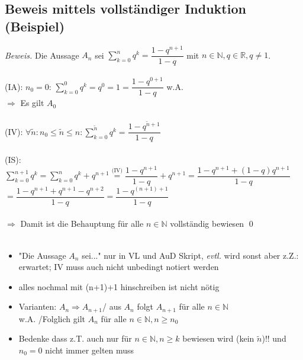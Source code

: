 \documentclass[10pt,a4paper]{article}
\begin{document}
\subsection{Beweis mittels vollständiger Induktion (Beispiel)}
\textit{Beweis.}
Die Aussage $A_{n}$ sei $\sum_{k=0}^{n} q^{k}= \dfrac{1-q^{n+1}}{1-q}$ mit $n \in \mathbb{N}, q \in \mathbb{R}, q \neq 1$.\\\\
(IA): $n_{0}=0$: $\sum_{k=0}^{0} q^{k}=q^{0}=1= \dfrac{1-q^{0+1}}{1-q}$ \hspace{0.3cm} w.A.\\
\hspace*{1cm}$\Rightarrow$ Es gilt $A_{0}$\\\\
(IV): $\forall \tilde{n}: n_{0} \leq \tilde{n} \leq n:\sum_{k=0}^{\tilde{n}} q^{k}= \dfrac{1-q^{\tilde{n}+1}}{1-q}$\\\\
(IS):$\sum_{k=0}^{n+1} q^{k}= \sum_{k=0}^{n} q^{k}+q^{n+1}\stackrel{\text{(IV)}}{=}\dfrac{1-q^{n+1}}{1-q}+q^{n+1}=\dfrac{1-q^{n+1}+(1-q)q^{n+1}}{1-q}$\\
\hspace*{2.23cm}$=\dfrac{1-q^{n+1}+q^{n+1}-q^{n+2}}{1-q}=\dfrac{1-q^{(n+1)+1}}{1-q}$\\\\
\hspace*{1cm}$\Rightarrow$ Damit ist die Behauptung für alle $n \in \mathbb{N}$ vollständig bewiesen
\qed\\\\
\begin{itemize}
\item "Die Aussage $A_{n}$ sei..." nur in VL und AuD Skript, \textit{evtl.} wird sonst aber z.Z.: erwartet; IV muss auch nicht unbedingt notiert werden
\item alles nochmal mit (n+1)+1 hinschreiben ist nicht nötig
\item Varianten: $A_{n} \Rightarrow A_{n+1}$/ aus $A_{n}$ folgt $A_{n+1}$ für alle $n\in \mathbb{N}$\\
 w.A. /Folglich gilt $A_{n}$ für alle $n \in \mathbb{N}, n \geq n_{0}$
\item Bedenke dass z.T. auch nur für $n \in \mathbb{N}, n\geq k$ bewiesen wird (kein $\tilde{n}$)!! und $n_{0}=0$ nicht immer gelten muss
\end{itemize}
\end{document}
